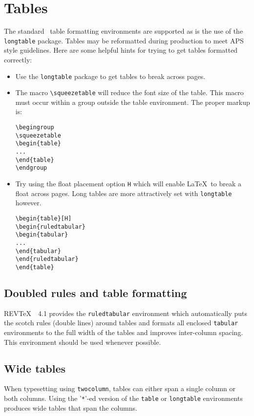 \documentclass[twocolumn,secnumarabic,amssymb, nobibnotes, aps, prd]{revtex4-1}
\newcommand{\revtex}{REV\TeX\ }
\newcommand{\classoption}[1]{\texttt{#1}}
\newcommand{\macro}[1]{\texttt{\textbackslash#1}}
\newcommand{\m}[1]{\macro{#1}}
\newcommand{\env}[1]{\texttt{#1}}
\begin{document}
\section{Tables}
\label{sec:tables}
The standard \LaTeXe\ table formatting environments are supported as is
the use of the \texttt{longtable} package. Tables may be reformatted
during production to meet APS style guidelines.
Here are some helpful hints for trying to get tables formatted correctly:
\begin{itemize}
\item Use the \texttt{longtable} package to get tables to break
across pages.
\item The macro \m{squeezetable} will reduce the font size of the
table. This macro must occur within a group outside the table
environment. The proper markup is:
\begin{verbatim}
\begingroup
\squeezetable
\begin{table}
...
\end{table}
\endgroup
\end{verbatim}
\item Try using the float placement option \texttt{H} which will
enable \LaTeX\ to break a float across pages. Long tables are more
attractively set with \env{longtable} however.
\begin{verbatim}
\begin{table}[H]
\begin{ruledtabular}
\begin{tabular}
...
\end{tabular}
\end{ruledtabular}
\end{table}
\end{verbatim}
\end{itemize}

\subsection{Doubled rules and table formatting}
\revtex\ 4.1 provides the \env{ruledtabular} environment which
automatically puts the scotch rules (double lines) around tables and
formats all enclosed \env{tabular} environments to the full width of
the tables and improves inter-column spacing. This environment should
be used whenever possible.

\subsection{Wide tables}
When typesetting using \classoption{twocolumn}, tables can either span
a single column or both columns. Using the '\verb+*+'-ed version of
the \env{table} or \env{longtable} environments produces wide tables
that span the columns.
\end{document}
